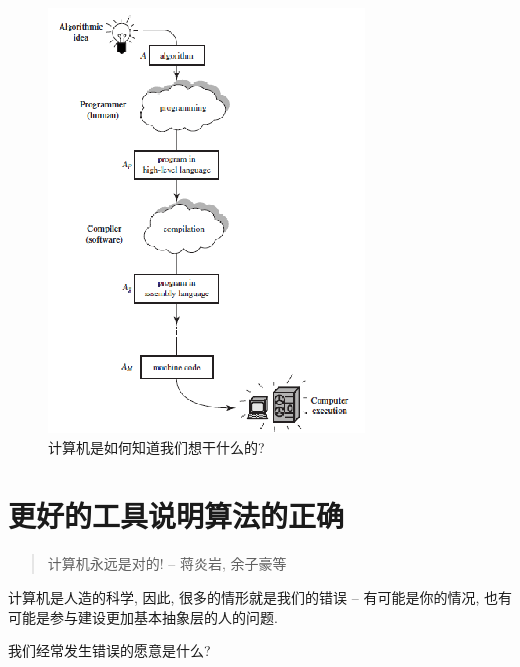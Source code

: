 \begin{figure}[h!]
	\centering
	\includegraphics[scale=0.8]{4-programs/figs/machine-note}
	\caption{计算机是如何知道我们想干什么的?}
	\label{figs:do-we-want}
	
\end{figure}


\section{更好的工具说明算法的正确}

\begin{quote}
	计算机永远是对的! \hfill -- 蒋炎岩, 余子豪等
\end{quote}

计算机是人造的科学, 因此, 很多的情形就是我们的错误 -- 有可能是你的情况, 也有可能是参与建设更加基本抽象层的人的问题. 

\begin{bonus}
	我们经常发生错误的愿意是什么? 
\end{bonus}

